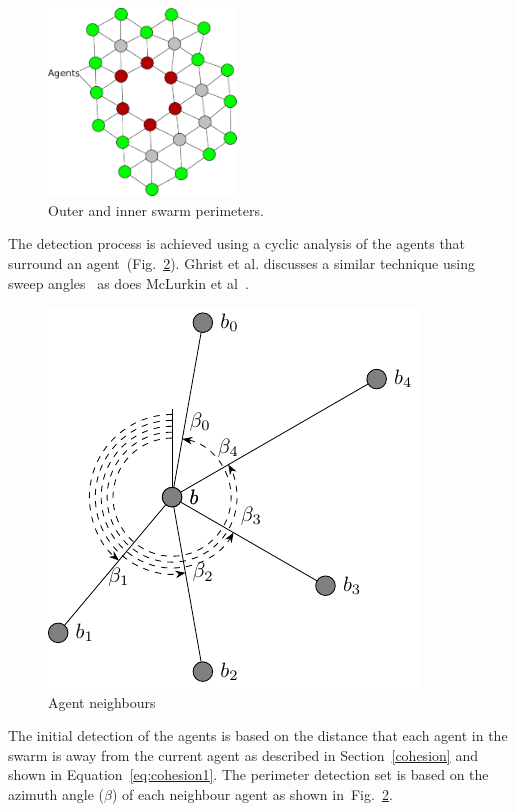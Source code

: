 \documentclass[12pt,a4paper]{IEEEtran}
\begin{document}
\begin{figure}[H]
	\begin{center}
		\includegraphics[width=5cm]{figures/PerimeterBots1}
	\end{center}
	\caption{{\color{green}Outer} and {\color{red}inner} swarm perimeters. \label{fig:innerOuterPerimeters}}
\end{figure}

The detection process is achieved using a cyclic analysis of the agents that surround an agent~(Fig.~\ref{fig:neighbours2}). Ghrist et al. discusses a similar technique using sweep angles~\cite{ghrist2008surrounding} as does McLurkin et al~\cite{mclurkin2009}. 

\begin{figure}[H]
	\centering
	\includegraphics[width=0.8\linewidth]{figures/neighbours2}
	\caption[Agent neighbours]{Agent neighbours}
	\label{fig:neighbours2}
\end{figure}

The initial detection of the agents is based on the distance that each agent in the swarm is away from the current agent as described in Section~\ref{cohesion} and shown in Equation~\ref{eq:cohesion1}. The perimeter detection set is based on the azimuth angle ($\beta$) of each neighbour agent as shown in~Fig.~\ref{fig:neighbours2}.
\end{document}
